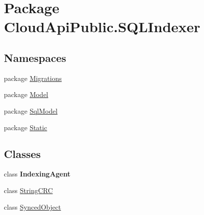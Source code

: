 \hypertarget{namespace_cloud_api_public_1_1_s_q_l_indexer}{\section{Package Cloud\-Api\-Public.\-S\-Q\-L\-Indexer}
\label{namespace_cloud_api_public_1_1_s_q_l_indexer}
}
\subsection*{Namespaces}
\begin{DoxyCompactItemize}
\item 
package \hyperlink{namespace_cloud_api_public_1_1_s_q_l_indexer_1_1_migrations}{Migrations}
\item 
package \hyperlink{namespace_cloud_api_public_1_1_s_q_l_indexer_1_1_model}{Model}
\item 
package \hyperlink{namespace_cloud_api_public_1_1_s_q_l_indexer_1_1_sql_model}{Sql\-Model}
\item 
package \hyperlink{namespace_cloud_api_public_1_1_s_q_l_indexer_1_1_static}{Static}
\end{DoxyCompactItemize}
\subsection*{Classes}
\begin{DoxyCompactItemize}
\item 
class {\bfseries Indexing\-Agent}
\item 
class \hyperlink{class_cloud_api_public_1_1_s_q_l_indexer_1_1_string_c_r_c}{String\-C\-R\-C}
\item 
class \hyperlink{class_cloud_api_public_1_1_s_q_l_indexer_1_1_synced_object}{Synced\-Object}
\end{DoxyCompactItemize}

